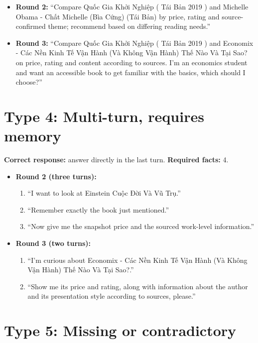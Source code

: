 \begin{itemize}
    \item \textbf{Round 2:} ``Compare Quốc Gia Khởi Nghiệp ( Tái Bản 2019 ) and Michelle Obama - Chất Michelle (Bìa Cứng) (Tái Bản) by price, rating and source-confirmed theme; recommend based on differing reading needs.''
    \item \textbf{Round 3:} ``Compare Quốc Gia Khởi Nghiệp ( Tái Bản 2019 ) and Economix - Các Nền Kinh Tế Vận Hành (Và Không Vận Hành) Thế Nào Và Tại Sao? on price, rating and content according to sources. I'm an economics student and want an accessible book to get familiar with the basics, which should I choose?''
\end{itemize}

\section*{Type 4: Multi-turn, requires memory}

\textbf{Correct response:} answer directly in the last turn. \textbf{Required facts:} 4.

\begin{itemize}
    \item \textbf{Round 2 (three turns):}
    \begin{enumerate}
        \item ``I want to look at Einstein Cuộc Đời Và Vũ Trụ.''
        \item ``Remember exactly the book just mentioned.''
        \item ``Now give me the snapshot price and the sourced work-level information.''
    \end{enumerate}
    \item \textbf{Round 3 (two turns):}
    \begin{enumerate}
        \item ``I'm curious about Economix - Các Nền Kinh Tế Vận Hành (Và Không Vận Hành) Thế Nào Và Tại Sao?.''
        \item ``Show me its price and rating, along with information about the author and its presentation style according to sources, please.''
    \end{enumerate}
\end{itemize}

\section*{Type 5: Missing or contradictory}

